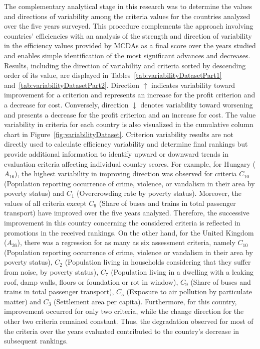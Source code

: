 \documentclass[final,5p,times,twocolumn,authoryear]{elsarticle}
\newcounter{example}[section]
\begin{document}
%
The complementary analytical stage in this research was to determine the values and directions of variability among the criteria values for the countries analyzed over the five years surveyed. This procedure complements the approach involving countries' efficiencies with an analysis of the strength and direction of variability in the efficiency values provided by MCDAs as a final score over the years studied and enables simple identification of the most significant advances and decreases. Results, including the direction of variability and criteria sorted by descending order of its value, are displayed in Tables~\ref{tab:variabilityDatasetPart1} and~\ref{tab:variabilityDatasetPart2}. Direction $\uparrow$ indicates variability toward improvement for a criterion and represents an increase for the profit criterion and a decrease for cost. Conversely, direction $\downarrow$ denotes variability toward worsening and presents a decrease for the profit criterion and an increase for cost. The value variability in criteria for each country is also visualized in the cumulative column chart in Figure~\ref{fig:variabilityDataset}. Criterion variability results are not directly used to calculate efficiency variability and determine final rankings but provide additional information to identify upward or downward trends in evaluation criteria affecting individual country scores. For example, for Hungary ($A_{16}$), the highest variability in improving direction was observed for criteria $C_{10}$ (Population reporting occurrence of crime, violence, or vandalism in their area by poverty status) and $C_{1}$ (Overcrowding rate by poverty status). Moreover, the values of all criteria except $C_{9}$ (Share of buses and trains in total passenger transport) have improved over the five years analyzed. Therefore, the successive improvement in this country concerning the considered criteria is reflected in promotions in the received rankings. On the other hand, for the United Kingdom ($A_{26}$), there was a regression for as many as six assessment criteria, namely $C_{10}$ (Population reporting occurrence of crime, violence or vandalism in their area by poverty status), $C_{2}$ (Population living in households considering that they suffer from noise, by poverty status), $C_{7}$ (Population living in a dwelling with a leaking roof, damp walls, floors
or foundation or rot in window), $C_{9}$ (Share of buses and trains in total passenger transport), $C_{5}$ (Exposure to air pollution by
particulate matter) and $C_{3}$ (Settlement area per capita). Furthermore, for this country, improvement occurred for only two criteria, while the change direction for the other two criteria remained constant. Thus, the degradation observed for most of the criteria over the years evaluated contributed to the country's decrease in subsequent rankings.
\end{document}
